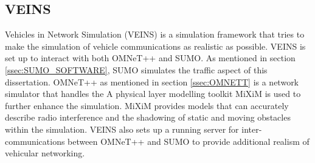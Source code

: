 \subsection{VEINS}
Vehicles in Network Simulation (VEINS) is a simulation framework that tries to make the simulation of vehicle communications as realistic as possible. VEINS is set up to interact with both OMNeT++ and SUMO. As mentioned in section \ref{ssec:SUMO_SOFTWARE}, SUMO simulates the traffic aspect of this dissertation. OMNeT++ as mentioned in section \ref{ssec:OMNETT} is a network simulator that handles the  A physical layer modelling toolkit MiXiM is used to further enhance the simulation. MiXiM provides models that can accurately describe radio interference and the shadowing of static and moving obstacles within the simulation. VEINS also sets up a running server for inter-communications between OMNeT++ and SUMO to provide additional realism of vehicular networking.